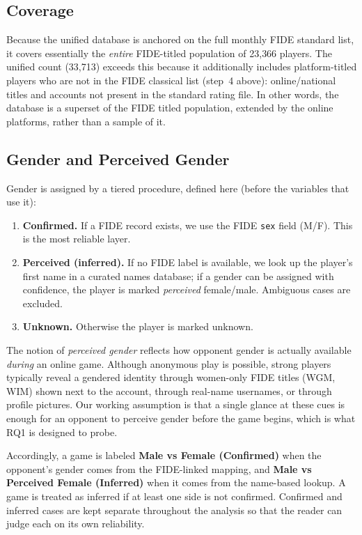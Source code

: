 \documentclass[11pt,a4paper]{article}
\begin{document}
\subsection{Coverage}
Because the unified database is anchored on the full monthly FIDE standard list, it covers
essentially the \emph{entire} FIDE-titled population of 23{,}366 players. The unified count
(33{,}713) exceeds this because it additionally includes platform-titled players who are not
in the FIDE classical list (step~4 above): online/national titles and accounts not present in
the standard rating file. In other words, the database is a superset of the FIDE titled
population, extended by the online platforms, rather than a sample of it.

\subsection{Gender and Perceived Gender}
\label{sec:gender}
Gender is assigned by a tiered procedure, defined here (before the variables that use it):
\begin{enumerate}
  \item \textbf{Confirmed.} If a FIDE record exists, we use the FIDE \texttt{sex} field
  (M/F). This is the most reliable layer.
  \item \textbf{Perceived (inferred).} If no FIDE label is available, we look up the player's
  first name in a curated names database; if a gender can be assigned with confidence, the
  player is marked \emph{perceived} female/male. Ambiguous cases are excluded.
  \item \textbf{Unknown.} Otherwise the player is marked unknown.
\end{enumerate}
The notion of \emph{perceived gender} reflects how opponent gender is actually available
\emph{during} an online game. Although anonymous play is possible, strong players typically
reveal a gendered identity through women-only FIDE titles (WGM, WIM) shown next to the
account, through real-name usernames, or through profile pictures. Our working assumption is
that a single glance at these cues is enough for an opponent to perceive gender before the
game begins, which is what RQ1 is designed to probe.

Accordingly, a game is labeled \textbf{Male vs Female (Confirmed)} when the opponent's gender
comes from the FIDE-linked mapping, and \textbf{Male vs Perceived Female (Inferred)} when it
comes from the name-based lookup. A game is treated as inferred if at least one side is not
confirmed. Confirmed and inferred cases are kept separate throughout the analysis so that the
reader can judge each on its own reliability.
\end{document}
